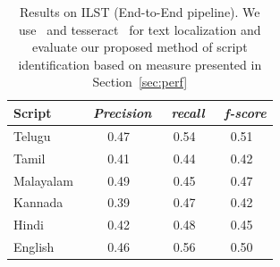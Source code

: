 
\begin{table}[!t]
\caption{Results on ILST (End-to-End pipeline). We use~\cite{GomezK14} and tesseract~\cite{tessOCR} for text localization and evaluate our proposed method of script identification based on measure presented in Section~\ref{sec:perf}} 
\centering
\begin{tabular}{|l|c|c|c|}
  \hline    
  Script &~\emph{Precision}&~\emph{recall}&~\emph{f-score}  \\      
  \hline\hline          
  Telugu & 0.47 & 0.54 & 0.51 \\
  Tamil & 0.41 & 0.44 & 0.42\\
  Malayalam & 0.49 & 0.45 & 0.47 \\
  Kannada & 0.39 & 0.47 & 0.42\\
  Hindi & 0.42 & 0.48 & 0.45\\
  English & 0.46 & 0.56 & 0.50\\
  \hline  
\end{tabular}
\label{tab:ILSTRes2} 
\end{table}

